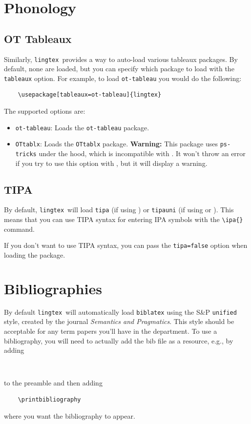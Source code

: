 \documentclass{article}
\def\lingtex{\texttt{lingtex}}
\begin{document}
\section{Phonology} \label{sec:phonology}

\subsection{OT Tableaux} \label{ssec:ot-tableaux}

Similarly, \lingtex\ provides a way to auto-load various tableaux packages. By default, none are loaded, but you can specify which package to load with the \verb|tableaux| option. For example, to load \texttt{ot-tableau} you would do the following:
\begin{verbatim}
    \usepackage[tableaux=ot-tableau]{lingtex}
\end{verbatim}
The supported options are:
\begin{itemize}
    \item \verb|ot-tableau|: Loads the \texttt{ot-tableau} package.
    \item \verb|OTtablx|: Loads the \texttt{OTtablx} package. \textbf{Warning:} This package uses \texttt{ps-tricks} under the hood, which is incompatible with . It won't throw an error if you try to use this option with , but it will display a warning.
\end{itemize}

\subsection{TIPA} \label{ssec:tipa}

By default, \lingtex\ will load \texttt{tipa} (if using ) or \texttt{tipauni} (if using  or ). This means that you can use TIPA syntax for entering IPA symbols with the \verb|\ipa{}| command.

If you don't want to use TIPA syntax, you can pass the \verb|tipa=false| option when loading the package.

\section{Bibliographies} \label{sec:bibliographies}

By default \lingtex\ will automatically load \texttt{biblatex} using the S\&P \verb|unified| style, created by the journal \emph{Semantics and Pragmatics}. This style should be acceptable for any term papers you'll have in the department. To use a bibliography, you will need to actually add the bib file as a resource, e.g., by adding
\begin{verbatim}
    
\end{verbatim}
to the preamble and then adding
\begin{verbatim}
    \printbibliography
\end{verbatim}
where you want the bibliography to appear.
\end{document}
